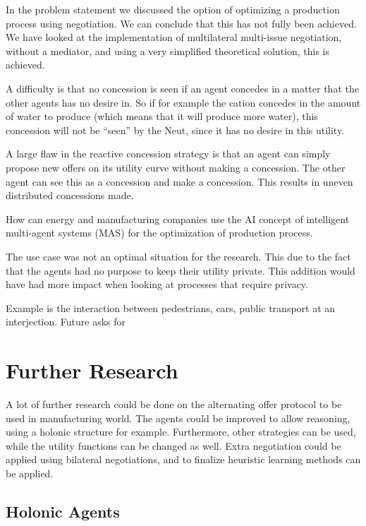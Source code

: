 In the problem statement we discussed the option of optimizing a production process using negotiation. We can conclude that this has not fully been achieved. We have looked at the implementation of multilateral multi-issue negotiation, without a mediator, and using a very simplified theoretical solution, this is achieved. 

A difficulty is that no concession is seen if an agent concedes in a matter that the other agents has no desire in. So if for example the cation concedes in the amount of water to produce (which means that it will produce more water), this concession will not be ``seen'' by the Neut, since it has no desire in this utility. %


A large flaw in the reactive concession strategy is that an agent can simply propose new offers on its utility curve without making a concession. The other agent can see this as a concession and make a concession. This results in uneven distributed concessions made. 

How can energy and manufacturing companies use the AI concept of intelligent multi-agent systems (MAS) for the optimization of production process.

The use case was not an optimal situation for the research. This due to the fact that the agents had no purpose to keep their utility private. This addition would have had more impact when looking at processes that require privacy.

Example is the interaction between pedestrians, cars, public transport at an interjection. Future asks for 

\section{Further Research}
A lot of further research could be done on the alternating offer protocol to be used in manufacturing world. The agents could be improved to allow reasoning, using a holonic structure for example. Furthermore, other strategies can be used, while the utility functions can be changed as well. Extra negotiation could be applied using bilateral negotiations, and to finalize heuristic learning methods can be applied.

\subsection{Holonic Agents}

